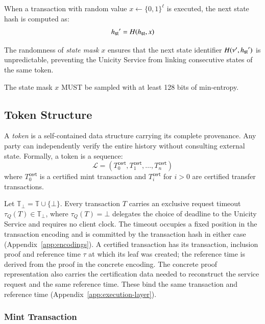 When a transaction with random value $x \gets \{0,1\}^\ell$ is executed, the next state hash is computed as:
\[
{h_\mathsf{st}}' = H({h_\mathsf{st}}, x)
\]

The randomness of \emph{state mask} $x$ ensures that the next state identifier $H(\nu', {h_\mathsf{st}}')$ is unpredictable, preventing the Unicity Service from linking consecutive states of the same token.

The state mask $x$ MUST be sampled with at least 128 bits of min-entropy.

\subsection{Token Structure}\label{sec:token-structure}

A \emph{token} is a self-contained data structure carrying its complete provenance. Any party can independently verify the entire history without consulting external state. Formally, a token is a sequence:
\[
\mathcal{L} = (T_0^\mathsf{cert}, T_1^\mathsf{cert}, \ldots, T_n^\mathsf{cert})
\]
where $T_0^\mathsf{cert}$ is a certified mint transaction and $T_i^\mathsf{cert}$ for $i > 0$ are certified transfer transactions.

Let $\mathbb{T}_\bot=\mathbb{T}\cup\{\bot\}$. Every transaction $T$ carries an exclusive request timeout $\tau_Q(T)\in\mathbb{T}_\bot$, where $\tau_Q(T)=\bot$ delegates the choice of deadline to the Unicity Service and requires no client clock. The timeout occupies a fixed position in the transaction encoding and is committed by the transaction hash in either case (Appendix~\ref{app:encodings}). A certified transaction has its transaction, inclusion proof and reference time $\tau$ at which its leaf was created; the reference time is derived from the proof in the concrete encoding. The concrete proof representation also carries the certification data needed to reconstruct the service request and the same reference time. These bind the same transaction and reference time (Appendix~\ref{app:execution-layer}).

\subsubsection{Mint Transaction}\label{sec:mint-tx}

